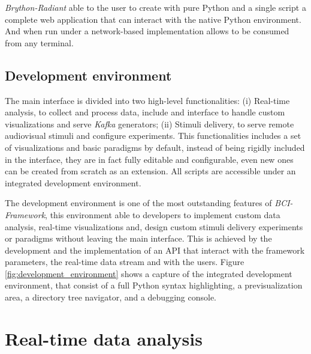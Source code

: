 \textit{Brython-Radiant} able to the user to create with pure Python and a single script a complete web application that can interact with the native Python environment. And when run under a network-based implementation allows to be consumed from any terminal. 


\subsection{Development environment}

The main interface is divided into two high-level functionalities: 
(i) Real-time analysis, to collect and process data, include and interface to handle custom visualizations and serve \textit{Kafka} generators;
(ii) Stimuli delivery, to serve remote audiovisual stimuli and configure experiments.
This functionalities includes a set of visualizations and basic paradigms by default, instead of being rigidly included in the interface, they are in fact fully editable and configurable, even new ones can be created from scratch as an extension. All scripts are accessible under an integrated development environment.



The development environment is one of the most outstanding features of \textit{BCI-Framework}, this environment able to developers to implement custom data analysis, real-time visualizations and, design custom stimuli delivery experiments or paradigms without leaving the main interface. This is achieved by the development and the implementation of an \gls*{API} that interact with the framework parameters, the real-time data stream and with the users. Figure \ref{fig:development_environment} shows a capture of the integrated development environment, that consist of a full Python syntax highlighting, a previsualization area, a directory tree navigator, and a debugging console.








\section{Real-time data analysis} \label{ch4:rt_data_analysis}  %

